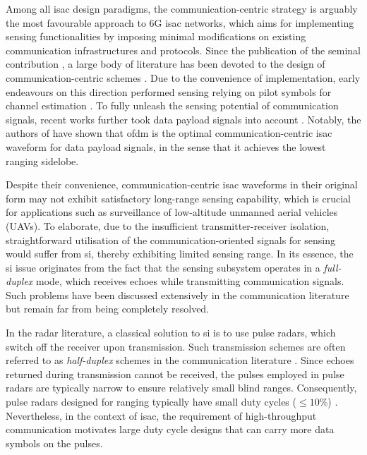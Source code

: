 \documentclass[journal,a4paper,10pt, romanappendices]{IEEEtran}
\begin{document}
Among all \ac{isac} design paradigms, the communication-centric strategy is arguably the most favourable approach to 6G \ac{isac} networks, which aims for implementing sensing functionalities by imposing minimal modifications on existing communication infrastructures and protocols. Since the publication of the seminal contribution \cite{sturm2011waveform}, a large body of literature has been devoted to the design of communication-centric schemes \cite{9359665,9005192,9109735,yuan2023otfs,FanLiu2024}. Due to the convenience of implementation, early endeavours on this direction performed sensing relying on pilot symbols for channel estimation \cite{80211ad}. To fully unleash the sensing potential of communication signals, recent works further took data payload signals into account \cite{YS2022,FanLiu2024,XiongTIT,giuseppeTIT}. Notably, the authors of \cite{FanLiu2024} have shown that \ac{ofdm} is the optimal communication-centric \ac{isac} waveform for data payload signals, in the sense that it achieves the lowest ranging sidelobe.

Despite their convenience, communication-centric \ac{isac} waveforms in their original form may not exhibit satisfactory long-range sensing capability, which is crucial for applications such as surveillance of low-altitude unmanned aerial vehicles (UAVs). To elaborate, due to the insufficient transmitter-receiver isolation, straightforward utilisation of the communication-oriented signals for sensing would suffer from \acf{si}, thereby exhibiting limited sensing range. In its essence, the \ac{si} issue originates from the fact that the sensing subsystem operates in a \emph{full-duplex} mode, which receives echoes while transmitting communication signals. Such problems have been discussed extensively in the communication literature \cite{fd1,fd2,fd3,fd4} but remain far from being completely resolved.

In the radar literature, a classical solution to \ac{si} is to use pulse radars, which switch off the receiver upon transmission. Such transmission schemes are often referred to as \emph{half-duplex} schemes in the communication literature \cite{hd_isac}. Since echoes returned during transmission cannot be received, the pulses employed in pulse radars are typically narrow to ensure relatively small blind ranges. Consequently, pulse radars designed for ranging typically have small duty cycles ($\leq 10$\%) \cite[Chap.~19]{radar_analysis}. Nevertheless, in the context of \ac{isac}, the requirement of high-throughput communication motivates large duty cycle designs that can carry more data symbols on the pulses. 
\end{document}
